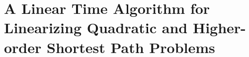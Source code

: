\chapter{A Linear Time Algorithm for Linearizing Quadratic and Higher-order Shortest Path Problems}
\label{ch:linearization-2}









